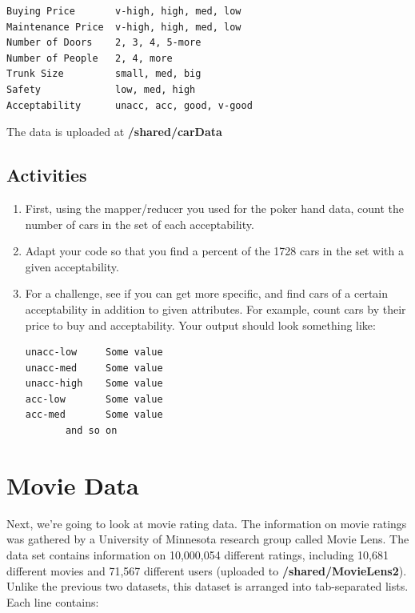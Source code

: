 \documentclass[letterpaper,10pt,openany,oneside]{sphinxmanual}
\begin{document}
\begin{Verbatim}[commandchars=\\\{\}]
Buying Price       v-high, high, med, low
Maintenance Price  v-high, high, med, low
Number of Doors    2, 3, 4, 5-more
Number of People   2, 4, more
Trunk Size         small, med, big
Safety             low, med, high
Acceptability      unacc, acc, good, v-good
\end{Verbatim}

The data is uploaded at \textbf{/shared/carData}


\subsection{Activities}
\label{WmrActivities/WmrActivities:id1}\begin{enumerate}
\item {} 
First, using the mapper/reducer you used for the poker hand
data, count the number of cars in the set of each acceptability.

\item {} 
Adapt your code so that you find a percent of the 1728 cars in
the set with a given acceptability.

\item {} 
For a challenge, see if you can get more specific, and find cars
of a certain acceptability in addition to given attributes. For
example, count cars by their price to buy and acceptability. Your
output should look something like:

\begin{Verbatim}[commandchars=\\\{\}]
unacc-low     Some value
unacc-med     Some value
unacc-high    Some value
acc-low       Some value
acc-med       Some value
       and so on
\end{Verbatim}

\end{enumerate}


\section{Movie Data}
\label{WmrActivities/WmrActivities:movie-data}
Next, we're going to look at movie rating data. The information on
movie ratings was gathered by a University of Minnesota research
group called Movie Lens. The data set contains information on
10,000,054 different ratings, including 10,681 different movies and
71,567 different users (uploaded to \textbf{/shared/MovieLens2}). Unlike the previous two datasets, this
dataset is arranged into tab-separated lists. Each line contains:
\end{document}
